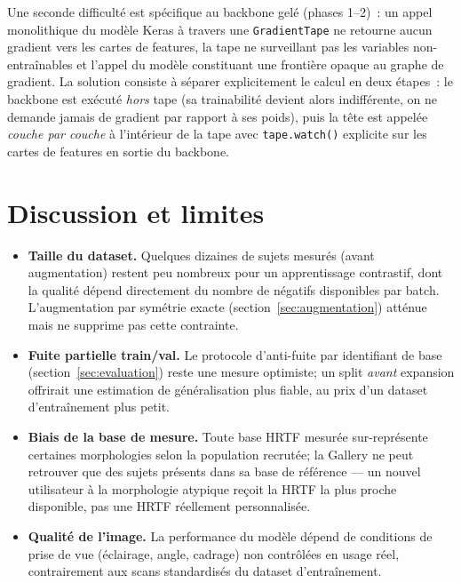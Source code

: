 \documentclass[12pt, a4paper]{article}
\begin{document}
Une seconde difficulté est spécifique au backbone gelé (phases 1--2)~: un
appel monolithique du modèle Keras à travers une \texttt{GradientTape} ne
retourne aucun gradient vers les cartes de features, la tape ne surveillant
pas les variables non-entraînables et l'appel du modèle constituant une
frontière opaque au graphe de gradient. La solution consiste à séparer
explicitement le calcul en deux étapes~: le backbone est exécuté \emph{hors}
tape (sa trainabilité devient alors indifférente, on ne demande jamais de
gradient par rapport à ses poids), puis la tête est appelée \emph{couche
par couche} à l'intérieur de la tape avec \texttt{tape.watch()} explicite
sur les cartes de features en sortie du backbone.

\section{Discussion et limites}
\label{sec:discussion}

\begin{itemize}
    \item \textbf{Taille du dataset.} Quelques dizaines de sujets mesurés
    (avant augmentation) restent peu nombreux pour un apprentissage
    contrastif, dont la qualité dépend directement du nombre de négatifs
    disponibles par batch. L'augmentation par symétrie exacte
    (section~\ref{sec:augmentation}) atténue mais ne supprime pas cette
    contrainte.
    \item \textbf{Fuite partielle train/val.} Le protocole d'anti-fuite par
    identifiant de base (section~\ref{sec:evaluation}) reste une mesure
    optimiste; un split \emph{avant} expansion offrirait une estimation de
    généralisation plus fiable, au prix d'un dataset d'entraînement plus
    petit.
    \item \textbf{Biais de la base de mesure.} Toute base HRTF mesurée
    sur-représente certaines morphologies selon la population recrutée; la
    Gallery ne peut retrouver que des sujets présents dans sa base de
    référence — un nouvel utilisateur à la morphologie atypique reçoit la
    HRTF la plus proche disponible, pas une HRTF réellement personnalisée.
    \item \textbf{Qualité de l'image.} La performance du modèle dépend de
    conditions de prise de vue (éclairage, angle, cadrage) non contrôlées
    en usage réel, contrairement aux scans standardisés du dataset
    d'entraînement.
\end{itemize}
\end{document}
